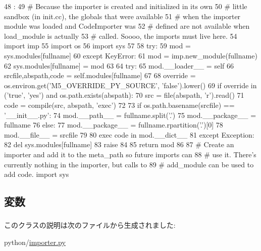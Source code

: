 \begin{DoxyCode}
48                                    :
49         # Because the importer is created and initialized in its own
50         # little sandbox (in init.cc), the globals that were available
51         # when the importer module was loaded and CodeImporter was
52         # defined are not available when load_module is actually
53         # called. Soooo, the imports must live here.
54         import imp
55         import os
56         import sys
57 
58         try:
59             mod = sys.modules[fullname]
60         except KeyError:
61             mod = imp.new_module(fullname)
62             sys.modules[fullname] = mod
63 
64         try:
65             mod.__loader__ = self
66             srcfile,abspath,code = self.modules[fullname]
67 
68             override = os.environ.get('M5_OVERRIDE_PY_SOURCE', 'false').lower()
69             if override in ('true', 'yes') and  os.path.exists(abspath):
70                 src = file(abspath, 'r').read()
71                 code = compile(src, abspath, 'exec')
72 
73             if os.path.basename(srcfile) == '__init__.py':
74                 mod.__path__ = fullname.split('.')
75                 mod.__package__ = fullname
76             else:
77                 mod.__package__ = fullname.rpartition('.')[0]
78             mod.__file__ = srcfile
79 
80             exec code in mod.__dict__
81         except Exception:
82             del sys.modules[fullname]
83             raise
84 
85         return mod
86 
87 # Create an importer and add it to the meta_path so future imports can
88 # use it.  There's currently nothing in the importer, but calls to
89 # add_module can be used to add code.
import sys
\end{DoxyCode}


\subsection{変数}
\hypertarget{classimporter_1_1CodeImporter_a7f721a262dd3d84c38ad13e9af027464}{
\subsubsection[{modules}]{}}
\label{classimporter_1_1CodeImporter_a7f721a262dd3d84c38ad13e9af027464}


このクラスの説明は次のファイルから生成されました:\begin{DoxyCompactItemize}
\item 
python/\hyperlink{importer_8py}{importer.py}\end{DoxyCompactItemize}
